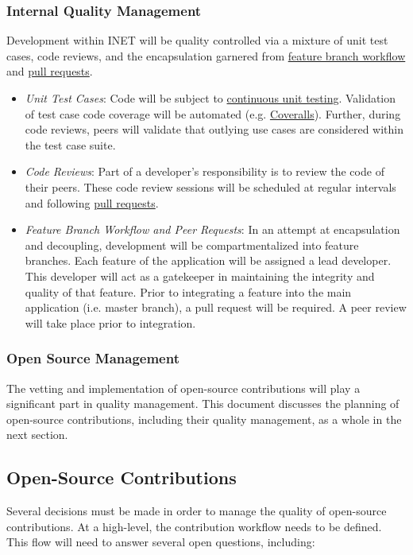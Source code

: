 \documentclass[a4paper]{article}
\begin{document}
\subsubsection{Internal Quality Management}
Development within INET will be quality controlled via a mixture of unit test cases, code reviews, and the encapsulation garnered from \href{https://www.atlassian.com/pt/git/workflows#!workflow-feature-branch}{feature branch workflow} and \href{https://help.github.com/articles/using-pull-requests}{pull requests}.

\begin{itemize}
  \item \textit{Unit Test Cases}: Code will be subject to \href{https://en.wikipedia.org/wiki/Unit_testing}{continuous unit testing}. Validation of test case code coverage will be automated (e.g. \href{https://coveralls.io/}{Coveralls}). Further, during code reviews, peers will validate that outlying use cases are considered within the test case suite.
  \item \textit{Code Reviews}: Part of a developer's responsibility is to review the code of their peers. These code review sessions will be scheduled at regular intervals and following \href{https://help.github.com/articles/using-pull-requests}{pull requests}.
  \item \textit{Feature Branch Workflow and Peer Requests}: In an attempt at encapsulation and decoupling, development will be compartmentalized into feature branches. Each feature of the application will be assigned a lead developer. This developer will act as a gatekeeper in maintaining the integrity and quality of that feature. Prior to integrating a feature into the main application (i.e. master branch), a pull request will be required. A peer review will take place prior to integration.
\end{itemize}

\subsubsection{Open Source Management}

The vetting and implementation of open-source contributions will play a significant part in quality management. This document discusses the planning of open-source contributions, including their quality management, as a whole in the next section. 

\subsection{Open-Source Contributions}
\label{opensource}
Several decisions must be made in order to manage the quality of open-source contributions. At a high-level, the contribution workflow needs to be defined. This flow will need to answer several open questions, including:
\end{document}
